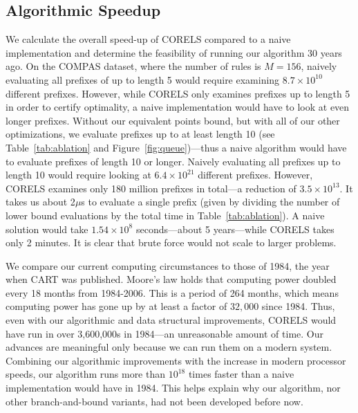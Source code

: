 \subsection{Algorithmic Speedup}
We calculate the overall speed-up of CORELS compared to a naive implementation and determine the feasibility of running
our algorithm 30 years ago.
%
On the COMPAS dataset, where the number of rules is $M = 156$, naively evaluating all prefixes of up to length 5 would
require examining $8.7 \times 10^{10}$ different prefixes.
%
However, while CORELS only examines prefixes up to length 5 in order to certify optimality, a naive implementation 
would have to look at even longer prefixes. 
%
Without our equivalent points bound, but with all of our other optimizations, we evaluate prefixes up to at least length 10 (see 
Table~\ref{tab:ablation} and Figure~\ref{fig:queue})---thus a naive algorithm would have to evaluate prefixes of length 10 or longer.
%
Naively evaluating all prefixes up to length 10 would require looking at $6.4 \times 10^{21}$ different prefixes.
%
However, CORELS examines only 180 million prefixes in total---a reduction of $3.5 \times 10^{13}$.
%
It takes us about 2$\mu$s to evaluate a single prefix (given by dividing the number of lower bound evaluations by the total time
in Table~\ref{tab:ablation}).
%
A naive solution would take $1.54 \times 10^8$ seconds---about 5 years---while CORELS takes only 2 minutes.
%
It is clear that brute force would not scale to larger problems.
%

We compare our current computing circumstances to those of 1984, the year when CART was published.
%
Moore's law holds that computing power doubled every 18 months from 1984-2006.
%
This is a period of 264 months, which means computing power has gone up by at least a factor of $32,000$ since 1984.
%
Thus, even with our algorithmic and data structural improvements, CORELS would have run in over 3,600,000s in 1984---an unreasonable amount of time.
%
Our advances are meaningful only because we can run them on a modern system.
%
Combining our algorithmic improvements with the increase in modern processor speeds, our algorithm runs more than $10^{18}$ times faster than a naive implementation would have in 1984.
%
This helps explain why our algorithm, nor other branch-and-bound variants, had not been developed before now.
